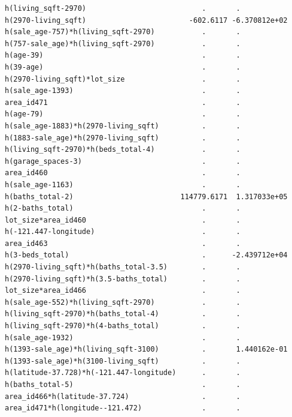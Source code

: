 \documentclass[
]{article}
\begin{document}
\begin{verbatim}
h(living_sqft-2970)                           .       .           
h(2970-living_sqft)                        -602.6117 -6.370812e+02
h(sale_age-757)*h(living_sqft-2970)           .       .           
h(757-sale_age)*h(living_sqft-2970)           .       .           
h(age-39)                                     .       .           
h(39-age)                                     .       .           
h(2970-living_sqft)*lot_size                  .       .           
h(sale_age-1393)                              .       .           
area_id471                                    .       .           
h(age-79)                                     .       .           
h(sale_age-1883)*h(2970-living_sqft)          .       .           
h(1883-sale_age)*h(2970-living_sqft)          .       .           
h(living_sqft-2970)*h(beds_total-4)           .       .           
h(garage_spaces-3)                            .       .           
area_id460                                    .       .           
h(sale_age-1163)                              .       .           
h(baths_total-2)                         114779.6171  1.317033e+05
h(2-baths_total)                              .       .           
lot_size*area_id460                           .       .           
h(-121.447-longitude)                         .       .           
area_id463                                    .       .           
h(3-beds_total)                               .      -2.439712e+04
h(2970-living_sqft)*h(baths_total-3.5)        .       .           
h(2970-living_sqft)*h(3.5-baths_total)        .       .           
lot_size*area_id466                           .       .           
h(sale_age-552)*h(living_sqft-2970)           .       .           
h(living_sqft-2970)*h(baths_total-4)          .       .           
h(living_sqft-2970)*h(4-baths_total)          .       .           
h(sale_age-1932)                              .       .           
h(1393-sale_age)*h(living_sqft-3100)          .       1.440162e-01
h(1393-sale_age)*h(3100-living_sqft)          .       .           
h(latitude-37.728)*h(-121.447-longitude)      .       .           
h(baths_total-5)                              .       .           
area_id466*h(latitude-37.724)                 .       .           
area_id471*h(longitude--121.472)              .       .           
                                                                    

\end{verbatim}
\end{document}
